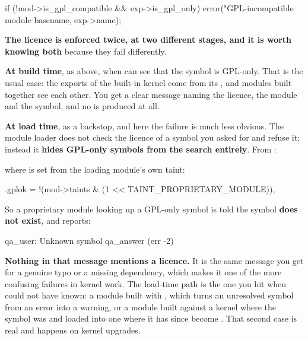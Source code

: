 \begin{ccode}
if (!mod->is_gpl_compatible && exp->is_gpl_only)
        error("GPL-incompatible module %
              basename, exp->name);
\end{ccode}

\noindent \textbf{The licence is enforced twice, at two different stages, and it is worth knowing
both} because they fail differently.

\textbf{At build time}, as above, when  can see that the symbol is GPL-only. That is
the usual case: the exports of the built-in kernel come from its , and modules
built together see each other. You get a clear message naming the licence, the module and the
symbol, and no  is produced at all.

\textbf{At load time}, as a backstop, and here the failure is much less obvious. The module loader
does not check the licence of a symbol you asked for and refuse it; instead it \textbf{hides
GPL-only symbols from the search entirely}. From :

\begin{ccode}
static bool find_exported_symbol_in_section(...)
{
        if (!fsa->gplok && syms->license == GPL_ONLY)
                return false;
\end{ccode}

\noindent where  is set from the loading module's own taint:

\begin{ccode}
.gplok = !(mod->taints & (1 << TAINT_PROPRIETARY_MODULE)),
\end{ccode}

\noindent So a proprietary module looking up a GPL-only symbol is told the symbol \textbf{does not
exist}, and  reports:

\begin{console}
qa_user: Unknown symbol qa_answer (err -2)
\end{console}

\noindent \textbf{Nothing in that message mentions a licence.} It is the same message you get for a
genuine typo or a missing dependency, which makes it one of the more confusing failures in kernel
work. The load-time path is the one you hit when  could not have known: a module built
with , which turns an unresolved symbol from an error into a warning, or
a module built against a kernel where the symbol was  and loaded into one where
it has since become . That second case is real and happens on kernel
upgrades.

